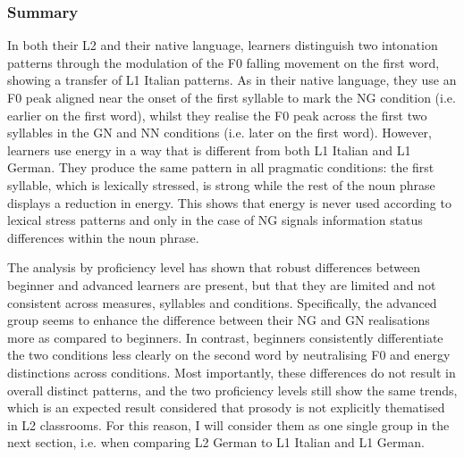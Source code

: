 \subsubsection{Summary}
\hypertarget{Toc191305910}{}
In both their L2 and their native language, learners distinguish two intonation patterns through the modulation of the F0 falling movement on the first word, showing a transfer of L1 Italian patterns. As in their native language, they use an F0 peak aligned near the onset of the first syllable to mark the NG condition (i.e. earlier on the first word), whilst they realise the F0 peak across the first two syllables in the GN and NN conditions (i.e. later on the first word). However, learners use energy in a way that is different from both L1 Italian and L1 German. They produce the same pattern in all pragmatic conditions: the first syllable, which is lexically stressed, is strong while the rest of the noun phrase displays a reduction in energy. This shows that energy is never used according to lexical stress patterns and only in the case of NG signals information status differences within the noun phrase.

The analysis by proficiency level has shown that robust differences between beginner and advanced learners are present, but that they are limited and not consistent across measures, syllables and conditions. Specifically, the advanced group seems to enhance the difference between their NG and GN realisations more as compared to beginners. In contrast, beginners consistently differentiate the two conditions less clearly on the second word by neutralising F0 and energy distinctions across conditions. Most importantly, these differences do not result in overall distinct patterns, and the two proficiency levels still show the same trends, which is an expected result considered that prosody is not explicitly thematised in L2 classrooms. For this reason, I will consider them as one single group in the next section, i.e. when comparing L2 German to L1 Italian and L1 German.

